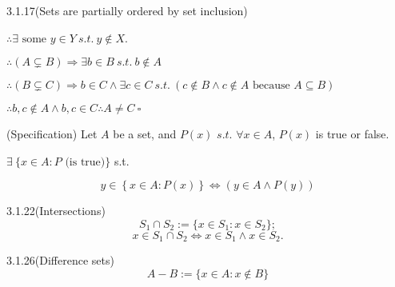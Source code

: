 \documentclass[letterpaper]{article}
\begin{document}
\begin{prbox}{3.1.17}{(Sets are partially ordered by set inclusion)}
\begin{center}
\begin{tcolorbox}[enhanced,
      frame hidden,
      frame corners lr rounded={5mm}{4.3pt}{5pt}{Lavender},
      width=8cm,
      colback=white,
      opacityback=1,
      ]
      $\therefore \exists \text{ some } y \in Y ~s.t.~ y \notin X$.
    \end{tcolorbox}
  \end{center}

  $\therefore (A \subsetneq B) \Rightarrow \exists b \in B ~s.t.~ b \notin A$

  $\therefore (B \subsetneq C) \Rightarrow b \in C \land \exists c \in C ~s.t.~ (c \notin B \land c \notin A \text{ because } A \subseteq B)$

  $\therefore b,c \notin A \land b,c \in C \therefore A \neq C ~\square$

\end{prbox}

\begin{axbox}{3.6}{(Specification)}
  Let $A$ be a set, and $P(x)$ $s.t.$ $\forall x \in A$, $P(x)$ is true or false.

  $\exists~ \{ x \in A : P \text{ (is true)} \}$ s.t.

  \[
    y \in \left\{
      x \in A: P(x)
    \right\}
    \iff
    \left(
      y \in A \land P(y)
    \right)
  \]

\end{axbox}

\begin{defbox}{3.1.22}{(Intersections)}
  \[
    S_1 \cap S_2 := \{ x \in S_1 : x \in S_2 \};
  \]
  \[
    x \in S_1 \cap S_2 \iff x \in S_1 \land x \in S_2.
  \]
\end{defbox}

\begin{defbox}{3.1.26}{(Difference sets)}
  \[
    A - B := \{ x \in A : x \notin B \}
  \]
\end{defbox}
\end{document}

